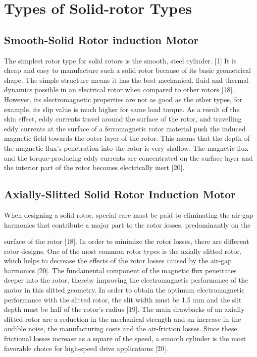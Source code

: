 \section{Types of Solid-rotor Types} %

\subsection{Smooth-Solid Rotor induction Motor} %

The simplest rotor type for solid rotors is the smooth, steel cylinder. [1] It is cheap
and easy to manufacture such a solid rotor because of its basic geometrical shape.
The simple structure means it has the best mechanical, fluid and thermal dynamics
possible in an electrical rotor when compared to other rotors [18]. However, its
electromagnetic properties are not as good as the other types, for example, its slip
value is much higher for same load torque. As a result of the skin effect, eddy
currents travel around the surface of the rotor, and travelling eddy currents at the
surface of a ferromagnetic rotor material push the induced magnetic field towards the
outer layer of the rotor. This means that the depth of the magnetic flux's penetration
into the rotor is very shallow. The magnetic flux and the torque-producing eddy
currents are concentrated on the surface layer and the interior part of the rotor
becomes electrically inert [20].

\subsection{Axially-Slitted Solid Rotor Induction Motor} %

When designing a solid rotor, special care must be paid to eliminating the air-gap
harmonics that contribute a major part to the rotor losses, predominantly on the

surface of the rotor [18]. In order to minimize the rotor losses, there are different
rotor designs. One of the most common rotor types is the axially slitted rotor, which
helps to decrease the effects of the rotor losses caused by the air-gap harmonics [20].
The fundamental component of the magnetic flux penetrates deeper into the rotor,
thereby improving the electromagnetic performance of the motor in this slitted
geometry. In order to obtain the optimum electromagnetic performance with the
slitted rotor, the slit width must be 1.5 mm and the slit depth must be half of the
rotor's radius [19]. The main drawbacks of an axially slitted rotor are a reduction in
the mechanical strength and an increase in the audible noise, the manufacturing costs
and the air-friction losses. Since these frictional losses increase as a square of the
speed, a smooth cylinder is the most favorable choice for high-speed drive
applications [20].

